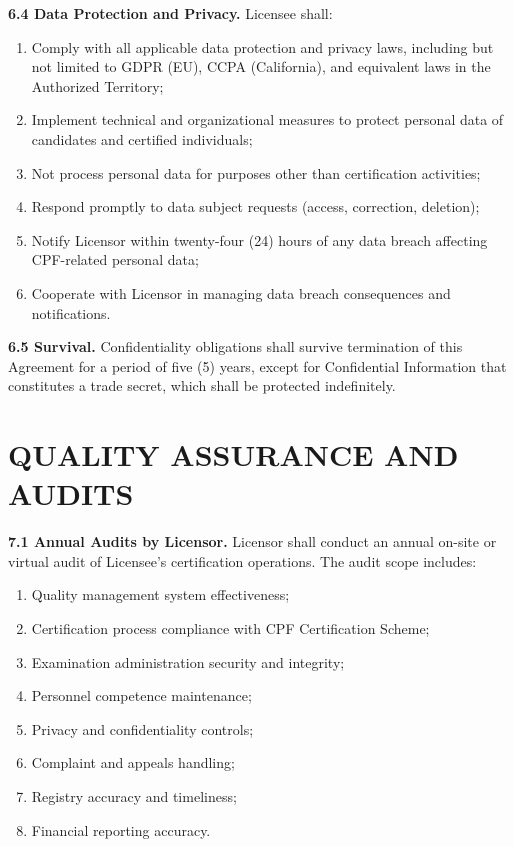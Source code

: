 \documentclass[11pt,a4paper]{article}
\begin{document}
\textbf{6.4 Data Protection and Privacy.} Licensee shall:

\begin{enumerate}[label=\alph*)]
\item Comply with all applicable data protection and privacy laws, including but not limited to GDPR (EU), CCPA (California), and equivalent laws in the Authorized Territory;
\item Implement technical and organizational measures to protect personal data of candidates and certified individuals;
\item Not process personal data for purposes other than certification activities;
\item Respond promptly to data subject requests (access, correction, deletion);
\item Notify Licensor within twenty-four (24) hours of any data breach affecting CPF-related personal data;
\item Cooperate with Licensor in managing data breach consequences and notifications.
\end{enumerate}

\textbf{6.5 Survival.} Confidentiality obligations shall survive termination of this Agreement for a period of five (5) years, except for Confidential Information that constitutes a trade secret, which shall be protected indefinitely.

\section{QUALITY ASSURANCE AND AUDITS}

\textbf{7.1 Annual Audits by Licensor.} Licensor shall conduct an annual on-site or virtual audit of Licensee's certification operations. The audit scope includes:

\begin{enumerate}[label=\alph*)]
\item Quality management system effectiveness;
\item Certification process compliance with CPF Certification Scheme;
\item Examination administration security and integrity;
\item Personnel competence maintenance;
\item Privacy and confidentiality controls;
\item Complaint and appeals handling;
\item Registry accuracy and timeliness;
\item Financial reporting accuracy.
\end{enumerate}
\end{document}
